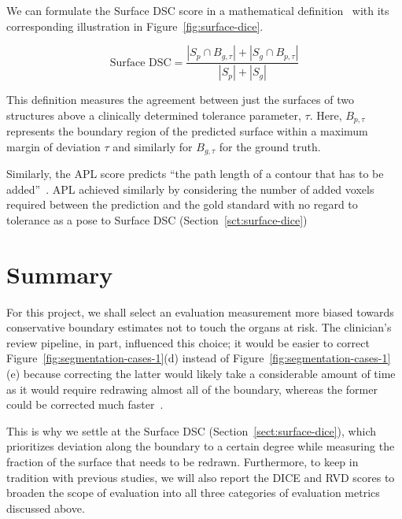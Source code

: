 \documentclass[11pt,twoside]{report}
\begin{document}
We can formulate the Surface DSC score in a mathematical definition~\cite{Sherer2021-le} with its corresponding illustration in Figure~\ref{fig:surface-dice}.

\begin{equation*}
 \text{Surface DSC} = \frac{|S_p \cap B_{g,\tau}| + |S_g \cap B_{p,\tau}|}{|S_p| + |S_g|}
\end{equation*}

This definition measures the agreement between just the surfaces of two structures above a clinically determined tolerance parameter, $\tau$. Here, $B_{p,\tau}$ represents the boundary region of the predicted surface within a maximum margin of deviation $\tau$ and similarly for $B_{g,\tau}$ for the ground truth.

Similarly, the APL score predicts ``the path length of a contour that has to be added''~\cite{APL}. APL achieved similarly by considering the number of added voxels required between the prediction and the gold standard with no regard to tolerance as a pose to Surface DSC (Section~\ref{sct:surface-dice})



\section{Summary}


For this project, we shall select an evaluation measurement more biased towards conservative boundary estimates not to touch the organs at risk. The clinician's review pipeline, in part, influenced this choice; it would be easier to correct Figure~\ref{fig:segmentation-cases-1}(d) instead of Figure~\ref{fig:segmentation-cases-1}(e) because correcting the latter would likely take a considerable amount of time as it would require redrawing almost all of the boundary, whereas the former could be corrected much faster~\cite{Nikolov2021-xe}.

This is why we settle at the Surface DSC (Section~\ref{sect:surface-dice}), which prioritizes deviation along the boundary to a certain degree while measuring the fraction of the surface that needs to be redrawn. Furthermore, to keep in tradition with previous studies, we will also report the DICE and RVD scores to broaden the scope of evaluation into all three categories of evaluation metrics discussed above. 
\end{document}
